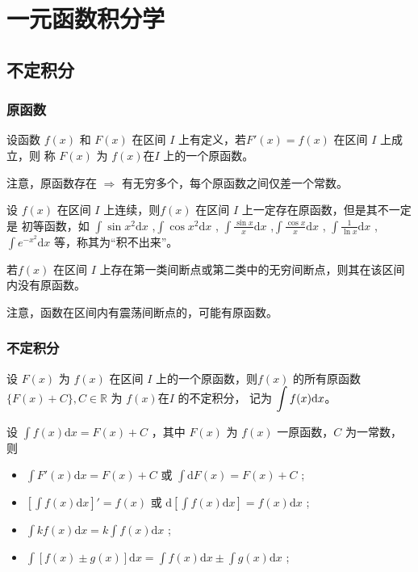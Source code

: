 \chapter{一元函数积分学}

\section{不定积分}

\subsection{原函数}

\begin{Def}[原函数]

    设函数 $ f(x) $ 和 $ F(x) $ 在区间 $ I $ 上有定义，若$ F'(x) = f(x) $ 在区间 $ I $ 上成立，则
    称 $ F(x) $ 为 $ f(x) $在$ I $ 上的一个原函数。
\end{Def}

注意，原函数存在 $ \Rightarrow $ 有无穷多个，每个原函数之间仅差一个常数。

设 $ f(x) $ 在区间 $ I $ 上连续，则$ f(x) $ 在区间 $ I $ 上一定存在原函数，但是其不一定是
初等函数，如 $ \int \sin x^2 \mathrm{d}x $ ,$ \int \cos x^2 \mathrm{d}x $ ,
$ \int \frac{\sin x}{x} \mathrm{d}x $ ,$ \int \frac{\cos x}{x} \mathrm{d}x $ ,
$ \int \frac{1}{\ln x} \mathrm{d}x $ , $ \int e^{-x^2} \mathrm{d}x $ 等，称其为“积不出来”。

若$ f(x) $ 在区间 $ I $ 上存在第一类间断点或第二类中的无穷间断点，则其在该区间内没有原函数。

注意，函数在区间内有震荡间断点的，可能有原函数。

\subsection{不定积分}

\begin{Def}[不定积分]

    设 $ F(x) $ 为 $ f(x) $ 在区间 $ I $ 上的一个原函数，则$ f(x) $ 
    的所有原函数 $ \{F(x)+C\},C\in \mathbb{R} $ 为 $ f(x) $在$ I $ 的不定积分，
    记为 $\displaystyle \int f(x) \mathrm{d}x$。
\end{Def}

\begin{Field}[不定积分基本性质]

    设 $ \int f(x)\mathrm{d}x = F(x)+C $ ，其中 $ F(x) $ 为 $ f(x) $ 一原函数，$ C $ 为一常数，
    则\begin{itemize}
        \item $ \int F'(x)\mathrm{d}x=F(x)+C $ 或 $ \int \mathrm{d}F(x)=F(x)+C $ ;
        \item $ [\int f(x)\mathrm{d}x]'=f(x) $ 或 $ \mathrm{d}[\int f(x)\mathrm{d}x]=f(x)\mathrm{d}x $ ;
        \item $ \int kf(x)\mathrm{d}x = k\int f(x)\mathrm{d}x $ ;
        \item $ \int [f(x)\pm g(x)]\mathrm{d}x = \int f(x)\mathrm{d}x \pm \int g(x)\mathrm{d}x $ ;
    \end{itemize}
\end{Field}

